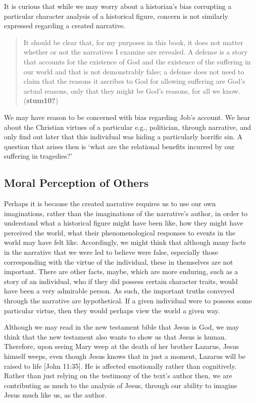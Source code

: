 \documentclass[12pt]{book}
\theoremstyle{definition}
\theoremstyle{remark}
\begin{document}
It is curious that while we may worry about a historian's bias corrupting a particular character analysis of a historical figure, concern is not similarly expressed regarding a created narrative.

\begin{quote}
It should be clear that, for my purposes in this book, it does not matter whether or not the narratives I examine are revealed. A defense is a story that accounts for the existence of God and the existence of the suffering in our world and that is not demonstrably false; a defense does not need to claim that the reasons it ascribes to God for allowing suffering are God's actual reasons, only that they might be God's reasons, for all we know. (\textbf{stum10?})
\end{quote}

We may have reason to be concerned with bias regarding Job's account. We hear about the Christian virtues of a particular e.g., politician, through narrative, and only find out later that this individual was hiding a particularly horrific sin. A question that arises then is `what are the relational benefits incurred by our suffering in tragedies?'

\subsection*{Moral Perception of Others}\label{moral-perception-of-others-2}

Perhaps it is because the created narrative requires us to use our own imaginations, rather than the imaginations of the narrative's author, in order to understand what a historical figure might have been like, how they might have perceived the world, what their phenomenological responses to events in the world may have felt like. Accordingly, we might think that although many facts in the narrative that we were led to believe were false, especially those corresponding with the virtue of the individual, these in themselves are not important. There are other facts, maybe, which are more enduring, such as a story of an individual, who if they did possess certain character traits, would have been a very admirable person. As such, the important truths conveyed through the narrative are hypothetical. If a given individual were to possess some particular virtue, then they would perhaps view the world a given way.

Although we may read in the new testament bible that Jesus is God, we may think that the new testament also wants to show us that Jesus is human. Therefore, upon seeing Mary weep at the death of her brother Lazarus, Jesus himself weeps, even though Jesus knows that in just a moment, Lazarus will be raised to life {[}John 11:35{]}. He is affected emotionally rather than cognitively. Rather than just relying on the testimony of the text's author then, we are contributing as much to the analysis of Jesus, through our ability to imagine Jesus much like us, as the author.
\end{document}
